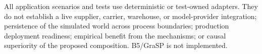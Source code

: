 All application scenarios and tests use deterministic or test-owned adapters. They do not establish a live supplier, carrier, warehouse, or model-provider integration; persistence of the simulated world across process boundaries; production deployment readiness; empirical benefit from the mechanisms; or causal superiority of the proposed composition. B5/GraSP is not implemented.


